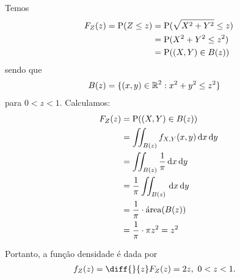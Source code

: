 \begin{example}
    Temos
    \begin{align*}
        F_Z(z) = \operatorname{P}(Z \le z)
        &= \operatorname{P}(\sqrt{X^2 + Y^2} \le z) \\
        &= \operatorname{P}(X^2 + Y^2 \le z^2) \\
        &= \operatorname{P}((X, Y) \in B(z))
    \end{align*}
    sendo que
    \begin{align*}
        B(z) &= \{(x, y) \in \operatorname{\mathbb{R}}^2 : x^2 + y^2 \le z^2\}
    \end{align*}
    para $0 < z < 1$. Calculamos:
    \begin{align*}
        F_Z(z) &= \operatorname{P}((X, Y) \in B(z)) \\
        &= \iint_{B(z)} f_{X, Y}(x, y) \,\mathrm{d} x \,\mathrm{d} y \\
        &= \iint_{B(z)} \frac{1}{\pi} \,\mathrm{d} x \,\mathrm{d} y \\
        &= \frac{1}{\pi} \iint_{B(z)} \,\mathrm{d} x \,\mathrm{d} y \\
        &= \frac{1}{\pi} \cdot \operatorname{\acute{a}rea}(B(z)) \\
        &= \frac{1}{\pi} \cdot \pi z^2  = z^2\\
    \end{align*}

    Portanto, a função densidade é dada por
    \begin{align*}
        f_Z(z) &= \diff{}{z}F_Z(z) = 2z,\ 0 < z < 1.
    \end{align*}
\end{example}
